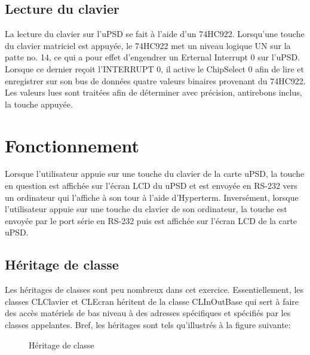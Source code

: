 \documentclass[10pt,a4paper,final]{article}
\begin{document}
\pagebreak
\subsection{Lecture du clavier}
La lecture du clavier sur l'uPSD se fait à l'aide d'un 74HC922. Lorsqu'une touche du clavier matriciel est appuyée, le 74HC922 met un niveau logique UN sur la patte no. 14, ce qui a pour effet d'engendrer un Erternal Interrupt 0 sur l'uPSD. Lorsque ce dernier reçoit l'INTERRUPT 0, il active le ChipSelect 0 afin de lire et enregistrer sur son bus de données quatre valeurs binaires provenant du 74HC922. Les valeurs lues sont traitées afin de déterminer avec précision, antirebons inclus, la touche appuyée.

\section{Fonctionnement}
Lorsque l'utilisateur appuie sur une touche du clavier de la carte uPSD, la touche en question est affichée sur l'écran LCD du uPSD et est envoyée en RS-232 vers un ordinateur qui l'affiche à son tour à l'aide d'Hyperterm. Inversément, lorsque l'utilisateur appuie sur une touche du clavier de son ordinateur, la touche est envoyée par le port série en RS-232 puis est affichée sur l'écran LCD de la carte uPSD.






\subsection{Héritage de classe}
Les héritages de classes sont peu nombreux dans cet exercice. Essentiellement, les classes CLClavier et CLEcran héritent de la classe CLInOutBase qui sert à faire des accès matériels de bas niveau à des adresses spécifiques et spécifiés par les classes appelantes. Bref, les héritages sont tels qu'illustrés à la figure suivante:
\begin{figure}[hbtp]
\caption{Héritage de classe}
\centering
{}
\end{figure}




\end{document}
